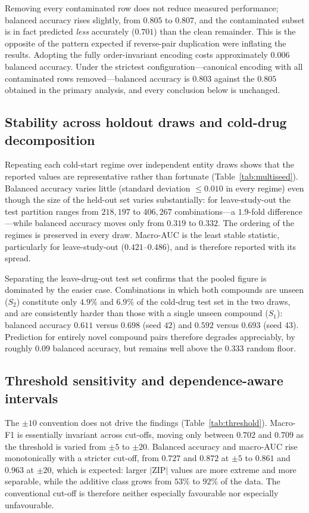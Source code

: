 \documentclass{bmcart}
\begin{document}
Removing every contaminated row does not reduce measured performance; balanced accuracy rises slightly,
from $0.805$ to $0.807$, and the contaminated subset is in fact predicted \emph{less} accurately
($0.701$) than the clean remainder. This is the opposite of the pattern expected if reverse-pair
duplication were inflating the results. Adopting the fully order-invariant encoding costs approximately
$0.006$ balanced accuracy. Under the strictest configuration---canonical encoding with all contaminated
rows removed---balanced accuracy is $0.803$ against the $0.805$ obtained in the primary analysis, and
every conclusion below is unchanged.

\subsection*{Stability across holdout draws and cold-drug decomposition}
Repeating each cold-start regime over independent entity draws shows that the reported values are
representative rather than fortunate (Table~\ref{tab:multiseed}). Balanced accuracy varies little
(standard deviation $\leq 0.010$ in every regime) even though the size of the held-out set varies
substantially: for leave-study-out the test partition ranges from $218{,}197$ to $406{,}267$
combinations---a $1.9$-fold difference---while balanced accuracy moves only from $0.319$ to $0.332$.
The ordering of the regimes is preserved in every draw. Macro-AUC is the least stable statistic,
particularly for leave-study-out ($0.421$--$0.486$), and is therefore reported with its spread.

Separating the leave-drug-out test set confirms that the pooled figure is dominated by the easier case.
Combinations in which both compounds are unseen ($S_2$) constitute only $4.9\%$ and $6.9\%$ of the
cold-drug test set in the two draws, and are consistently harder than those with a single unseen
compound ($S_1$): balanced accuracy $0.611$ versus $0.698$ (seed $42$) and $0.592$ versus $0.693$
(seed $43$). Prediction for entirely novel compound pairs therefore degrades appreciably, by roughly
$0.09$ balanced accuracy, but remains well above the $0.333$ random floor.

\subsection*{Threshold sensitivity and dependence-aware intervals}
The $\pm 10$ convention does not drive the findings (Table~\ref{tab:threshold}). Macro-F1 is
essentially invariant across cut-offs, moving only between $0.702$ and $0.709$ as the threshold is
varied from $\pm 5$ to $\pm 20$. Balanced accuracy and macro-AUC rise monotonically with a stricter
cut-off, from $0.727$ and $0.872$ at $\pm 5$ to $0.861$ and $0.963$ at $\pm 20$, which is expected:
larger $|$ZIP$|$ values are more extreme and more separable, while the additive class grows from $53\%$
to $92\%$ of the data. The conventional cut-off is therefore neither especially favourable nor
especially unfavourable.
\end{document}
